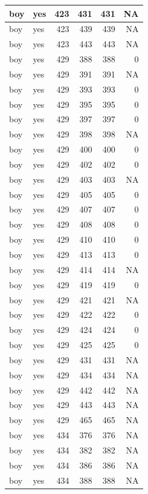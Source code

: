 \documentclass[man]{apa6}
\begin{document}
\begin{tabular}{l|l|r|r|r|r}
\hline
boy & yes & 423 & 431 & 431 & NA\\
\hline
boy & yes & 423 & 439 & 439 & NA\\
\hline
boy & yes & 423 & 443 & 443 & NA\\
\hline
boy & yes & 429 & 388 & 388 & 0\\
\hline
boy & yes & 429 & 391 & 391 & NA\\
\hline
boy & yes & 429 & 393 & 393 & 0\\
\hline
boy & yes & 429 & 395 & 395 & 0\\
\hline
boy & yes & 429 & 397 & 397 & 0\\
\hline
boy & yes & 429 & 398 & 398 & NA\\
\hline
boy & yes & 429 & 400 & 400 & 0\\
\hline
boy & yes & 429 & 402 & 402 & 0\\
\hline
boy & yes & 429 & 403 & 403 & NA\\
\hline
boy & yes & 429 & 405 & 405 & 0\\
\hline
boy & yes & 429 & 407 & 407 & 0\\
\hline
boy & yes & 429 & 408 & 408 & 0\\
\hline
boy & yes & 429 & 410 & 410 & 0\\
\hline
boy & yes & 429 & 413 & 413 & 0\\
\hline
boy & yes & 429 & 414 & 414 & NA\\
\hline
boy & yes & 429 & 419 & 419 & 0\\
\hline
boy & yes & 429 & 421 & 421 & NA\\
\hline
boy & yes & 429 & 422 & 422 & 0\\
\hline
boy & yes & 429 & 424 & 424 & 0\\
\hline
boy & yes & 429 & 425 & 425 & 0\\
\hline
boy & yes & 429 & 431 & 431 & NA\\
\hline
boy & yes & 429 & 434 & 434 & NA\\
\hline
boy & yes & 429 & 442 & 442 & NA\\
\hline
boy & yes & 429 & 443 & 443 & NA\\
\hline
boy & yes & 429 & 465 & 465 & NA\\
\hline
boy & yes & 434 & 376 & 376 & NA\\
\hline
boy & yes & 434 & 382 & 382 & NA\\
\hline
boy & yes & 434 & 386 & 386 & NA\\
\hline
boy & yes & 434 & 388 & 388 & NA\\

\end{tabular}
\end{document}
